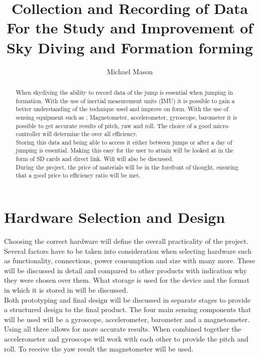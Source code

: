 \documentclass{report}
\begin{document}
\title{Collection and Recording of Data For the Study and Improvement of Sky Diving and Formation forming}
\author{Michael Mason}

\maketitle


\begin{abstract}
When skydiving the ability to record data of the jump is essential when jumping in formation. With the use of inertial measurement units (IMU) it is possible to gain a better understanding of the technique used and improve on form. With the use of sensing equipment such as ; Magnetometer, accelerometer, gyroscope, barometer it is possible to get accurate results of pitch, yaw and roll. The choice of a good micro-controller will determine the over all efficiency.\\
Storing this data and being able to access it either between jumps or after a day of jumping is essential. Making this easy for the user to attain will be looked at in the form of SD cards and direct link. Wifi will also be discussed.\\
During the project, the price of materials will be in the forefront of thought, ensuring that a good price to efficiency ratio will be met.

\end{abstract}

\tableofcontents



\chapter{Hardware Selection and Design}
Choosing the correct hardware will define the overall practicality of the project. Several factors have to be taken into consideration when selecting hardware such as functionality, connections, power consumption and size with many more. These will be discussed in detail and compared to other products with indication why they were chosen over them. What storage is used for the device and the format in which it is stored in will be discussed.\\
Both prototyping and final design will be discussed in separate stages to provide a structured design to the final product.
The four main sensing components that will be used will be a gyroscope, accelerometer, barometer and a magnetometer. Using all three allows for more accurate results. When combined together the accelerometer and gyroscope will work with each other to provide the pitch and roll. To receive the yaw result the magnetometer will be used.
\end{document}
